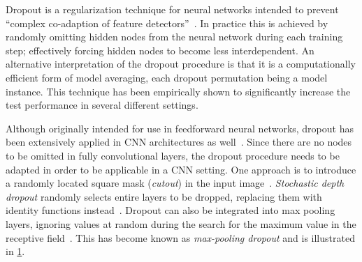 Dropout is a regularization technique for neural networks intended to prevent \enquote{complex co-adaption of feature detectors}~\cite{dropout-original-paper}.
In practice this is achieved by randomly omitting hidden nodes from the neural network during each training step; effectively forcing hidden nodes to become less interdependent.
An alternative interpretation of the dropout procedure is that it is a computationally efficient form of model averaging, each dropout permutation being a model instance.
This technique has been empirically shown to significantly increase the test performance in several different settings.

Although originally intended for use in feedforward neural networks, dropout has been extensively applied in CNN architectures as well~\cite{dropout-cnn}.
Since there are no nodes to be omitted in fully convolutional layers, the dropout procedure needs to be adapted in order to be applicable in a CNN setting.
One approach is to introduce a randomly located square mask (\textit{cutout}) in the input image~\cite{dropout-cutout}.
\textit{Stochastic depth dropout} randomly selects entire layers to be dropped, replacing them with identity functions instead~\cite{dropout-stochastic-depth}.
Dropout can also be integrated into max pooling layers, ignoring values at random during the search for the maximum value in the receptive field~\cite{max-pooling-dropout}.
This has become known as \textit{max-pooling dropout} and is illustrated in \cref{fig:max-pooling-dropout}.

\begin{figure}[H]
  
  \label{fig:max-pooling-dropout}
\end{figure}
